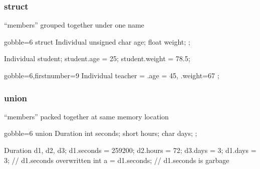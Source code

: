 \begin{frame}[fragile,label=current]
  \frametitle{struct}
  \begin{mdframed}[style=simplebox]
    \center ``members'' grouped together under one name
  \end{mdframed}
  \begin{multicols}{2}
    \begin{cppcode*}{gobble=6}
      struct Individual {
        unsigned char age;
        float weight;
      };

      Individual student;
      student.age = 25;
      student.weight = 78.5;
    \end{cppcode*}
    \columnbreak
    \begin{cppcode*}{gobble=6,firstnumber=9}
      Individual teacher = {
        .age = 45,
        .weight=67
      };
    \end{cppcode*}
    \pause
    \null \vfill
    \vfill \null
  \end{multicols}
\end{frame}

\begin{frame}[fragile]
  \frametitle{union}
  \begin{mdframed}[style=simplebox]
    \center ``members'' packed together at same memory location
  \end{mdframed}
  \begin{multicols}{2}
    \begin{cppcode*}{gobble=6}
      union Duration {
        int seconds;
        short hours;
        char days;
      };

      Duration d1, d2, d3;
      d1.seconds = 259200;
      d2.hours = 72;
      d3.days = 3;
      d1.days = 3; // d1.seconds overwritten
      int a = d1.seconds; // d1.seconds is garbage
    \end{cppcode*}
    \pause
    \columnbreak
    \null \vfill
    \vfill \null
  \end{multicols}
\end{frame}

